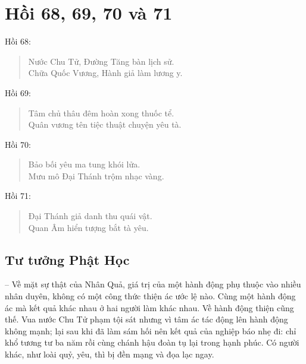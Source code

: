 \chapter{Hồi 68, 69, 70 và 71} %
\label{cha:hoi_68_69}

Hồi 68:

\begin{verse}
\begin{itshape}
Nước Chu Tử, Đường Tăng bàn lịch sử.\\
Chữa Quốc Vương, Hành giả làm lương y.
\end{itshape}
\end{verse}

Hồi 69:

\begin{verse}
\begin{itshape}
Tâm chủ thâu đêm hoàn xong thuốc tể.\\
Quân vương tên tiệc thuật chuyện yêu tà.
\end{itshape}
\end{verse}

Hồi 70:

\begin{verse}
\begin{itshape}
Bảo bối yêu ma tung khói lửa.\\
Mưu mô Đại Thánh trộm nhạc vàng.
\end{itshape}
\end{verse}

Hồi 71:

\begin{verse}
\begin{itshape}
Đại Thánh giả danh thu quái vật.\\
Quan Âm hiển tượng bắt tà yêu.
\end{itshape}
\end{verse}

\section{Tư tưởng Phật Học} %
\label{sec:68_69_phat_hoc}

-- Về mặt sự thật của Nhân Quả, giá trị của một hành động phụ thuộc vào nhiều nhân duyên, không có một công thức thiện ác ước lệ nào. Cùng một hành động ác mà kết quả khác nhau ở hai người làm khác nhau. Về hành động thiện cũng thế. Vua nước Chu Tử phạm tội sát nhưng vì tâm ác tác động lên hành động không mạnh; lại sau khi đã làm sám hối nên kết quả của nghiệp báo nhẹ đi: chỉ khổ tương tư ba năm rồi cùng chánh hậu đoàn tụ lại trong hạnh phúc. Có người khác, như loài quỷ, yêu, thì bị đền mạng và đọa lạc ngay.

